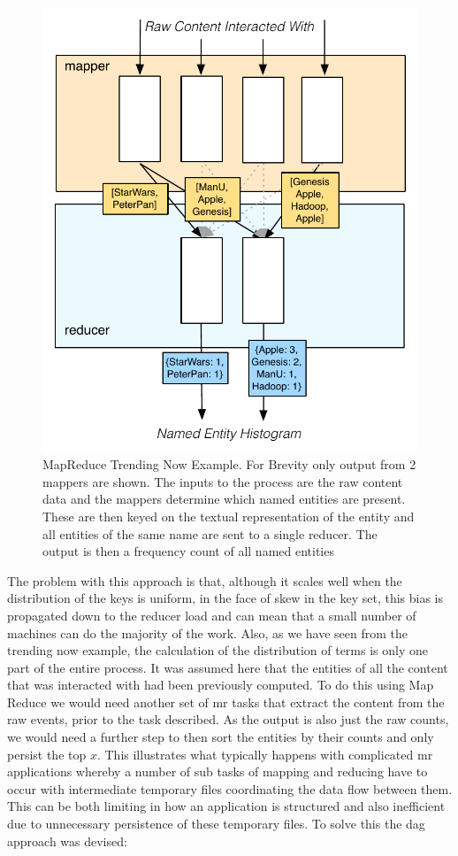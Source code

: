 \documentclass[a4paper,11pt]{scrreprt}
\begin{document}
\begin{figure}[h]
\centering
\includegraphics[scale=0.7] {MapReduceEx.pdf}
\caption{MapReduce Trending Now Example. For Brevity only output from 2 mappers are shown. The inputs to the process are the raw content data and the mappers determine which named entities are present. These are then keyed on the textual representation of the entity and all entities of the same name are sent to a single reducer. The output is then a frequency count of all named entities}
\label{fig:MapReduceEx}
\end{figure}

The problem with this approach is that, although it scales well when the distribution of the keys is uniform, in the face of skew in the key set, this bias is propagated down to the reducer load and can mean that a small number of machines can do the majority of the work. Also, as we have seen from the trending now example, the calculation of the distribution of terms is only one part of the entire process. It was assumed here that the entities of all the content that was interacted with had been previously computed. To do this using Map Reduce we would need another set of \acrshort{mr} tasks that extract the content from the raw events, prior to the task described. As the output is also just the raw counts, we would need a further step to then sort the entities by their counts and only persist the top \(x\). This illustrates what typically happens with complicated \acrshort{mr} applications whereby a number of sub tasks of mapping and reducing have to occur with intermediate temporary files coordinating the data flow between them. This can be both limiting in how an application is structured and also inefficient due to unnecessary persistence of these temporary files. To solve this the \acrshort{dag} approach was devised:
\end{document}
